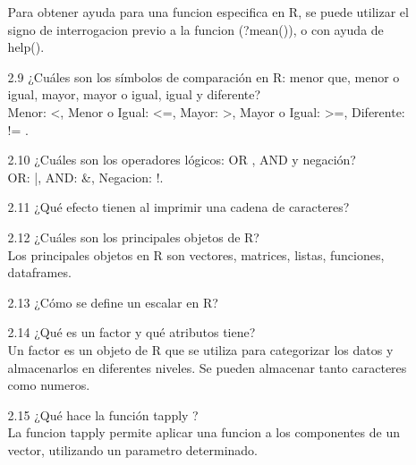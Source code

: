 \documentclass[letterpaper, 12pt]{article}
\begin{document}
\begin{enumerate}
\begin{enumerate}
Para obtener ayuda para una funcion especifica en R, se puede utilizar el signo
de interrogacion previo a la funcion (?mean()), o con ayuda de help().
\item[2.9] ¿Cuáles son los símbolos de comparación en R: menor que, menor o 
igual, mayor, mayor o igual, igual y diferente?\\
Menor: <, Menor o Igual: <=, Mayor: >, Mayor o Igual: >=, Diferente: != . 
\item[2.10] ¿Cuáles son los operadores lógicos: OR , AND y negación?\\
OR: |, AND: \&, Negacion: !.
\item[2.11] ¿Qué efecto tienen  al imprimir una cadena de caracteres?
\item[2.12] ¿Cuáles son los principales objetos de R?\\
Los principales objetos en R son vectores, matrices, listas, funciones, 
dataframes.
\item[2.13] ¿Cómo se define un escalar en R?
\item[2.14] ¿Qué es un factor y qué atributos tiene?\\
Un factor es un objeto de R que se utiliza para categorizar los datos y 
almacenarlos en diferentes niveles. Se pueden almacenar tanto caracteres como 
numeros.
\item[2.15] ¿Qué hace la función tapply ?\\
La funcion tapply permite aplicar una funcion a los componentes de un vector, 
utilizando un parametro determinado. 
\end{enumerate}


\end{enumerate}
\end{document}
